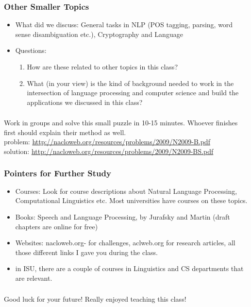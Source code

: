 \documentclass{beamer}
\begin{document}
\begin{frame}
\frametitle{Other Smaller Topics}
\begin{itemize}
\item What did we discuss:  General tasks in NLP (POS tagging, parsing, word sense disambiguation etc.), Cryptography and Language
\item Questions:
\begin{enumerate}
\item How are these related to other topics in this class?
\item What (in your view) is the kind of background needed to work in the intersection of language processing and computer science and build the applications we discussed in this class?
\end{enumerate}
\end{itemize}
\end{frame}

\begin{frame}
\frametitle{}
\centering
Work in groups and solve this small puzzle in 10-15 minutes. Whoever finishes first should explain their method as well. \bigskip
\footnotesize 
\pause \\ problem: \url{http://nacloweb.org/resources/problems/2009/N2009-B.pdf}
\\ solution: \url{http://nacloweb.org/resources/problems/2009/N2009-BS.pdf}
\end{frame}

\begin{frame}
\frametitle{Pointers for Further Study}
\begin{itemize}
\item Courses: Look for course descriptions about Natural Language Processing, Computational Linguistics etc. Most universities have courses on these topics. 
\item Books: Speech and Language Processing, by Jurafsky and Martin (draft chapters are online for free)
\item Websites: nacloweb.org- for challenges, aclweb.org for research articles, all those different links I gave you during the class.
\item in ISU, there are a couple of courses in Linguistics and CS departments that are relevant. 
\end{itemize}
\end{frame}

\begin{frame}
\frametitle{}
\centering
Good luck for your future! Really enjoyed teaching this class!
\end{frame}
\end{document}
